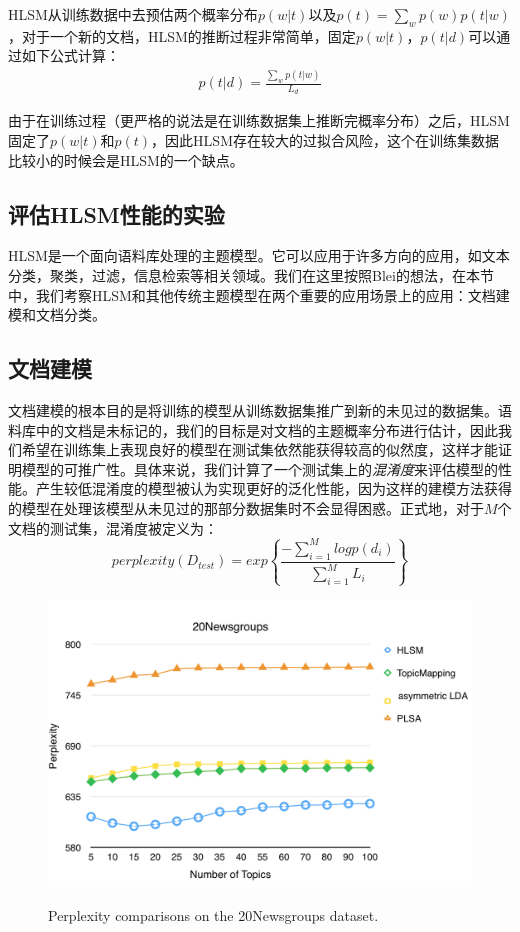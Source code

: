 HLSM从训练数据中去预估两个概率分布$p(w|t)$以及$p(t) = \sum_{w}p(w)p(t|w)$，对于一个新的文档，HLSM的推断过程非常简单，固定$p(w|t)$，$p(t|d)$可以通过如下公式计算：
   \begin{equation}
 \begin{split}
 p(t|d) = \frac{\sum_wp(t|w)}{L_d}
 \end{split}
 \end{equation}
 
由于在训练过程（更严格的说法是在训练数据集上推断完概率分布）之后，HLSM固定了$p(w|t)$和$p(t)$，因此HLSM存在较大的过拟合风险，这个在训练集数据比较小的时候会是HLSM的一个缺点。
 
\subsection{评估HLSM性能的实验}
HLSM是一个面向语料库处理的主题模型。它可以应用于许多方向的应用，如文本分类，聚类，过滤，信息检索等相关领域。我们在这里按照Blei的想法\cite{LDA}，在本节中，我们考察HLSM和其他传统主题模型在两个重要的应用场景上的应用：文档建模和文档分类。
\subsection{文档建模}
文档建模的根本目的是将训练的模型从训练数据集推广到新的未见过的数据集。语料库中的文档是未标记的，我们的目标是对文档的主题概率分布进行估计，因此我们希望在训练集上表现良好的模型在测试集依然能获得较高的似然度，这样才能证明模型的可推广性。具体来说，我们计算了一个测试集上的\emph{混淆度}来评估模型的性能。产生较低混淆度的模型被认为实现更好的泛化性能，因为这样的建模方法获得的模型在处理该模型从未见过的那部分数据集时不会显得困惑。正式地，对于$ M $个文档的测试集，混淆度被定义为：
  \begin{equation}
  perplexity(D_{test}) = exp \left \{ \frac{-\sum_{i=1}^Mlogp(d_i)}{\sum_{i=1}^ML_i}\right \}
  \end{equation}
   \begin{figure}[h]
\centering
  \includegraphics[width=1.0\textwidth]{./graph/perplexitycolor.png}\\
  \caption{Perplexity comparisons on the 20Newsgroups dataset.}\label{fig:perplexity}
\end{figure} 

